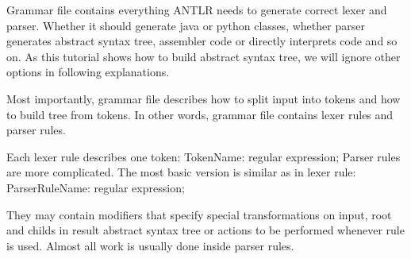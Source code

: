 Grammar file contains everything ANTLR needs to generate correct lexer and parser. Whether it should generate java or python classes, whether parser generates abstract syntax tree, assembler code or directly interprets code and so on. As this tutorial shows how to build abstract syntax tree, we will ignore other options in following explanations.

Most importantly, grammar file describes how to split input into tokens and how to build tree from tokens. In other words, grammar file contains lexer rules and parser rules.

Each lexer rule describes one token: TokenName: regular expression; Parser rules are more complicated. The most basic version is similar as in lexer rule: ParserRuleName: regular expression;  

They may contain modifiers that specify special transformations on input, root and childs in result abstract syntax tree or actions to be performed whenever rule is used. Almost all work is usually done inside parser rules.